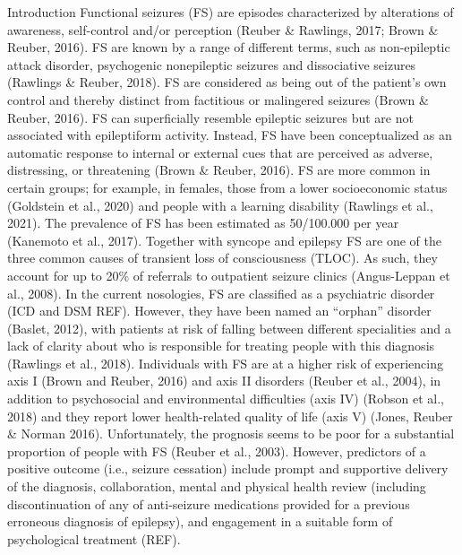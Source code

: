 \documentclass[
  12pt,
  openany]{book}
\begin{document}
Introduction
Functional seizures (FS) are episodes characterized by alterations of awareness, self-control and/or perception (Reuber \& Rawlings, 2017; Brown \& Reuber, 2016). FS are known by a range of different terms, such as non-epileptic attack disorder, psychogenic nonepileptic seizures and dissociative seizures (Rawlings \& Reuber, 2018). FS are considered as being out of the patient's own control and thereby distinct from factitious or malingered seizures (Brown \& Reuber, 2016).
FS can superficially resemble epileptic seizures but are not associated with epileptiform activity. Instead, FS have been conceptualized as an automatic response to internal or external cues that are perceived as adverse, distressing, or threatening (Brown \& Reuber, 2016). FS are more common in certain groups; for example, in females, those from a lower socioeconomic status (Goldstein et al., 2020) and people with a learning disability (Rawlings et al., 2021). The prevalence of FS has been estimated as 50/100.000 per year (Kanemoto et al., 2017). Together with syncope and epilepsy FS are one of the three common causes of transient loss of consciousness (TLOC). As such, they account for up to 20\% of referrals to outpatient seizure clinics (Angus-Leppan et al., 2008). In the current nosologies, FS are classified as a psychiatric disorder (ICD and DSM REF). However, they have been named an ``orphan'' disorder (Baslet, 2012), with patients at risk of falling between different specialities and a lack of clarity about who is responsible for treating people with this diagnosis (Rawlings et al., 2018).
Individuals with FS are at a higher risk of experiencing axis I (Brown and Reuber, 2016) and axis II disorders (Reuber et al., 2004), in addition to psychosocial and environmental difficulties (axis IV) (Robson et al., 2018) and they report lower health-related quality of life (axis V) (Jones, Reuber \& Norman 2016). Unfortunately, the prognosis seems to be poor for a substantial proportion of people with FS (Reuber et al., 2003). However, predictors of a positive outcome (i.e., seizure cessation) include prompt and supportive delivery of the diagnosis, collaboration, mental and physical health review (including discontinuation of any of anti-seizure medications provided for a previous erroneous diagnosis of epilepsy), and engagement in a suitable form of psychological treatment (REF).\\
\end{document}
